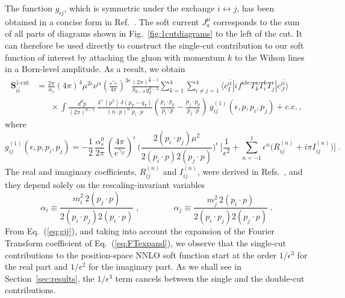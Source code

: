 \documentclass[a4paper,11pt]{article}
\newcommand{\bfS}{\bm{S}}
\newcommand{\iibar}{{i \bar i}}
\def \pipj{(p_i\cdot p_j)}
\def \pip{(p_i\cdot p)}
\def \pjp{(p_j\cdot p)}
\def \ai{\alpha_i}
\def \aj{\alpha_j}
\numberwithin{equation}{section}
\begin{document}
The function $g_{ij}$, which is symmetric under the exchange $i\leftrightarrow
j$, has been obtained in a concise form in Ref.~\cite{Czakon:2018iev}.
%
The soft current $J_a^{\mu}$ corresponds to the sum of all parts of diagrams
shown in Fig.~\ref{fig:1cutdiagrams} to the left of the cut. It can therefore be
used directly to construct the single-cut contribution to our soft function of
interest by attaching the gluon with momentum $k$ to the Wilson lines in
a Born-level amplitude. As a result, we obtain
%
\begin{align}
  \bfS^\text{1-cut}_\iibar 
  & = 
  \frac{2\pi}{\alpha_s}
  (4\pi)^4
  \mu^{2\epsilon} \nu^\alpha
  \left(\frac{e^{\gamma_E}}{4\pi}\right)^{3\epsilon}
  \frac{(2\pi)^{\frac{d}{2}-1}}{ S_{d-3}\,q_T^{d-3}}
  \sum_{k=1}^{4} \sum_{i\neq j=1}^4 
  \langle c_I^{i\bar i} | i f^{abc} T_k^a T_i^b T_j^c |c_J^{i\bar i} \rangle\,
  \nonumber \\[0.5em]
  &
  \hspace{20pt}
  \times \int \frac{d^d p}{(2\pi)^{d-1}}\, 
  \frac{\delta^{+}(p^2)\, \delta(p_T-q_T)}{(n\cdot p)^\alpha\; p_i \cdot p}
                    \left(
		    \frac{p_i\cdot p_p}{p_i \cdot p}-
                    \frac{p_j\cdot p_p}{p_j \cdot p}
		    \right)\,
		    g_{ij}^{(1)}(\epsilon,p, p_i, p_j) + \text{c.c.}\,,
  \label{eq:S1cut-main}
\end{align}
%
where~\cite{Czakon:2018iev}
%
\begin{equation}
  g^{(1)}_{ij}(\epsilon, p, p_i, p_j) = 
  - \frac{1}{2} \,
  \frac{\alpha_s^0}{2\pi} \, \left(\frac{4\pi}{e^{\gamma_E}}\right)^\epsilon
  \, \Bigg( \frac{2 \pipj \mu^2}{2
  \pip 2 \pjp} \Bigg)^\epsilon \, \Bigg[ \frac{1}{\epsilon^2} + \sum_{n=-1}^1
  \epsilon^n \Big( R_{ij}^{(n)} + i\pi I_{ij}^{(n)} \Big) \Bigg] \;.
  \label{eq:gij}
\end{equation}
%
The real and imaginary coefficients, $R_{ij}^{(n)}$ and $ I_{ij}^{(n)}$, were derived
in Refs.~\cite{Bierenbaum:2011gg, Czakon:2018iev}, and they depend solely on the
rescaling-invariant variables
%
\begin{equation}
  \ai \equiv \frac{m_i^2  \, 2 \pjp}{2 \pipj 2 \pip} \; , 
  \qquad \qquad
  \aj \equiv \frac{m_j^2 \, 2 \pip}{2 \pipj 2 \pjp} \; .
\end{equation}
%
From Eq.~(\ref{eq:gij}), and taking into account the expansion of the Fourier
Transform coefficient of Eq.~(\ref{eq:FTexpand}), we observe that the
single-cut contributions to the position-space NNLO soft function start at the order
$1/\epsilon^3$ for the real part and $1/\epsilon^2$ for the imaginary part.
%
As we shall see in Section~\ref{sec:results}, the $1/\epsilon^3$ term cancels
between the single and  the double-cut contributions.
\end{document}
